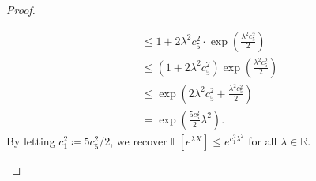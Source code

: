 \begin{proof}
\begin{itemize}
\begin{align*}
			       & \leq 1 + 2 \lambda ^2 c_5^2 \cdot \exp \left( \frac{\lambda ^2 c_5^2}{2} \right)                                                                                                                                                                                                                         \\
			       & \leq \left( 1 + 2 \lambda ^2 c_5^2 \right) \exp \left( \frac{\lambda ^2 c_5^2}{2} \right)                                                                                                                                                                                                                \\
			       & \leq \exp \left( 2\lambda ^2 c_5^2 + \frac{\lambda ^2 c_5^2}{2} \right) \tag*{\(1+x \leq e^x\)}                                                                                                                                                                                                          \\
			       & = \exp \left( \frac{5 c_5^2}{2} \lambda ^2 \right).
		      \end{align*}
		      By letting \(c_1^2 \coloneqq 5c_5^2 / 2\), we recover \(\mathbb{E}_{}\left[e^{\lambda X} \right] \leq e^{c_1^2 \lambda ^2}\) for all \(\lambda \in \mathbb{R} \).
	\end{itemize}
\end{proof}

